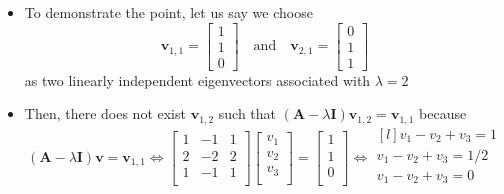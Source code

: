 \documentclass[12pt,a4paper]{article}
\begin{document}
\begin{itemize}
\begin{itemize}
    \begin{itemize}
    \item To demonstrate the point, let us say we choose
      \begin{equation}\label{eq:eigenvector_fail}%
        \bm{v}_{1,1}
        =
        \begin{bmatrix}
          1 \\ 1 \\ 0
        \end{bmatrix}
        \quad\text{and}\quad
        \bm{v}_{2,1}
        =
        \begin{bmatrix}
          0 \\ 1 \\ 1
        \end{bmatrix}
      \end{equation}
      as two linearly independent eigenvectors associated with $\lambda=2$
    \item Then, there does not exist $\bm{v}_{1,2}$ such that $(\bm{A}-\lambda \bm{I})\bm{v}_{1,2}=\bm{v}_{1,1}$ because
      \begin{equation}\nonumber%
        (\bm{A}-\lambda \bm{I})\bm{v} = \bm{v}_{1,1}
        \iff
      \begin{bmatrix}
        1 & -1 & 1 \\
        2 & -2 & 2 \\
        1 & -1 & 1 \\
      \end{bmatrix}
      \begin{bmatrix}
        v_{1} \\
        v_{2} \\
        v_{3} \\
      \end{bmatrix}
      =
      \begin{bmatrix}
        1 \\
        1 \\
        0 \\
      \end{bmatrix}
      \iff
      \begin{matrix*}[l]
      v_{1} - v_{2} + v_{3} = 1 \\
      v_{1} - v_{2} + v_{3} = 1/2 \\
      v_{1} - v_{2} + v_{3} = 0 \\
      \end{matrix*}
      \end{equation}


\end{itemize}
\end{itemize}
\end{itemize}
\end{document}
